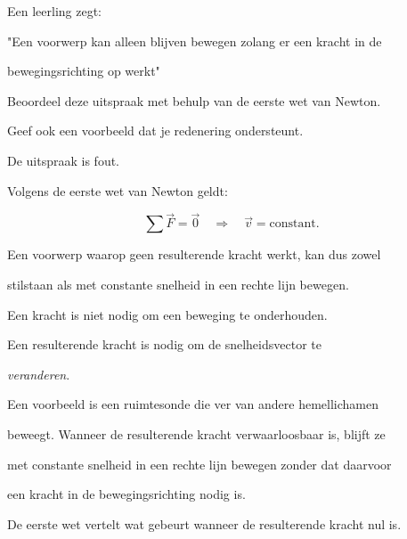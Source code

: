 \documentclass{ximera}
\begin{document}
\begin{oefening}{\oefU\ESS}

Een leerling zegt:

\begin{center}

"Een voorwerp kan alleen blijven bewegen zolang er een kracht in de

bewegingsrichting op werkt"

\end{center}

Beoordeel deze uitspraak met behulp van de eerste wet van Newton.

Geef ook een voorbeeld dat je redenering ondersteunt.


\begin{oplossing}

De uitspraak is fout.

Volgens de eerste wet van Newton geldt:

\[\sum\vec F=\vec0 \quad\Longrightarrow\quad \vec v=\text{constant}.\]

Een voorwerp waarop geen resulterende kracht werkt, kan dus zowel

stilstaan als met constante snelheid in een rechte lijn bewegen.

Een kracht is niet nodig om een beweging te onderhouden.

Een resulterende kracht is nodig om de snelheidsvector te

\emph{veranderen}.

Een voorbeeld is een ruimtesonde die ver van andere hemellichamen

beweegt. Wanneer de resulterende kracht verwaarloosbaar is, blijft ze

met constante snelheid in een rechte lijn bewegen zonder dat daarvoor

een kracht in de bewegingsrichting nodig is.

\end{oplossing}

\end{oefening}






De eerste wet vertelt wat gebeurt wanneer de resulterende kracht nul is.
\end{document}
